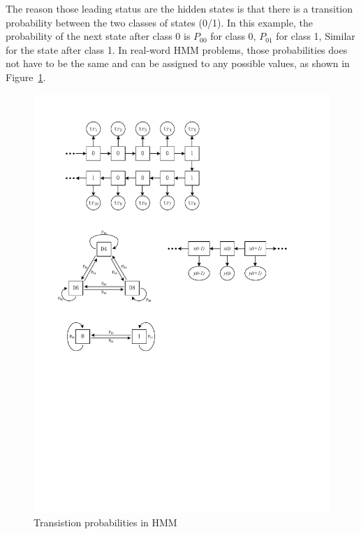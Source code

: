 \documentclass[conference]{IEEEtran}
\begin{document}
The reason those leading status are the hidden states is that there is a transition probability between the two classes of states (0/1). In this example, the probability of the next state after class 0 is $P_{00}$ for class 0, $P_{01}$ for class 1, Similar for the state after class 1. In real-word HMM problems, those probabilities does not have to be the same and can be assigned to any possible values, as shown in Figure~\ref{fig:trasitionCar}. 
\begin{figure}[H]
	\centering
	\includegraphics{transitionCar.pdf}
	\caption{Transistion probabilities in HMM}
	\label{fig:trasitionCar}
\end{figure}
\end{document}
